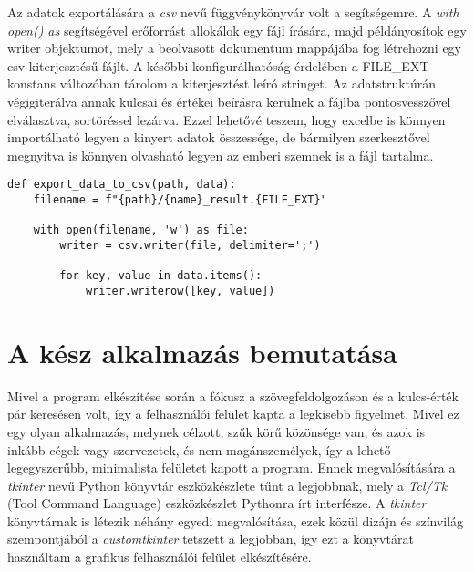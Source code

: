 \documentclass[12pt]{report}
\begin{document}
Az adatok exportálására a \emph{csv} nevű függvénykönyvár volt a segítségemre. A \emph{with open() as} segítségével erőforrást allokálok egy fájl írására, majd példányosítok egy writer objektumot, mely a beolvasott dokumentum mappájába fog létrehozni egy csv kiterjesztésű fájlt. A későbbi konfigurálhatóság érdelében a FILE\_EXT konstans változóban tárolom a kiterjesztést leíró stringet. Az adatstruktúrán végigiterálva annak kulcsai és értékei beírásra kerülnek a fájlba pontosvesszővel elválasztva, sortöréssel lezárva. Ezzel lehetővé teszem, hogy excelbe is könnyen importálható legyen a kinyert adatok összessége, de bármilyen szerkesztővel megnyitva is könnyen olvasható legyen az emberi szemnek is a fájl tartalma.

\begin{verbatim}
def export_data_to_csv(path, data):
    filename = f"{path}/{name}_result.{FILE_EXT}"

    with open(filename, 'w') as file:
        writer = csv.writer(file, delimiter=';')

        for key, value in data.items():
            writer.writerow([key, value])
\end{verbatim}

\chapter{A kész alkalmazás bemutatása}

Mivel a program elkészítése során a fókusz a szövegfeldolgozáson és a kulcs-érték pár keresésen volt, így a felhasználói felület kapta a legkisebb figyelmet. Mivel ez egy olyan alkalmazás, melynek célzott, szűk körű közönsége van, és azok is inkább cégek vagy szervezetek, és nem magánszemélyek, így a lehető legegyszerűbb, minimalista felületet kapott a program.
Ennek megvalósítására a \emph{tkinter} nevű Python könyvtár eszközkészlete tűnt a legjobbnak, mely a \emph{Tcl/Tk} (Tool Command Language) eszközkészlet Pythonra írt interfésze. A \emph{tkinter} könyvtárnak is létezik néhány egyedi megvalósítása, ezek közül dizájn és színvilág szempontjából a \emph{customtkinter} tetszett a legjobban, így ezt a könyvtárat használtam a grafikus felhasználói felület elkészítésére.
\end{document}
